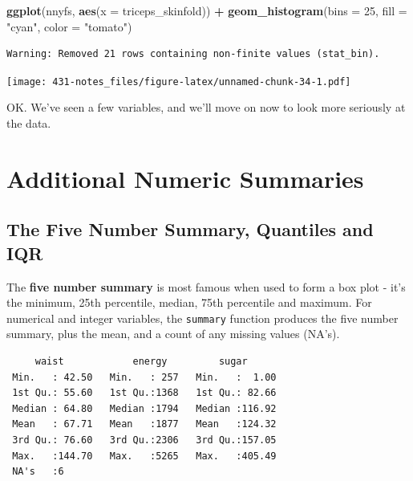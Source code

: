 \documentclass[
]{book}
\newenvironment{Shaded}{\begin{snugshade}}{\end{snugshade}}
\newcommand{\DataTypeTok}[1]{\textcolor[rgb]{0.13,0.29,0.53}{#1}}
\newcommand{\DecValTok}[1]{\textcolor[rgb]{0.00,0.00,0.81}{#1}}
\newcommand{\KeywordTok}[1]{\textcolor[rgb]{0.13,0.29,0.53}{\textbf{#1}}}
\newcommand{\NormalTok}[1]{#1}
\newcommand{\OperatorTok}[1]{\textcolor[rgb]{0.81,0.36,0.00}{\textbf{#1}}}
\newcommand{\StringTok}[1]{\textcolor[rgb]{0.31,0.60,0.02}{#1}}
\begin{document}
\begin{Shaded}
\begin{Highlighting}[]
\KeywordTok{ggplot}\NormalTok{(nnyfs, }\KeywordTok{aes}\NormalTok{(}\DataTypeTok{x =}\NormalTok{ triceps_skinfold)) }\OperatorTok{+}
\StringTok{  }\KeywordTok{geom_histogram}\NormalTok{(}\DataTypeTok{bins =} \DecValTok{25}\NormalTok{, }\DataTypeTok{fill =} \StringTok{"cyan"}\NormalTok{, }\DataTypeTok{color =} \StringTok{"tomato"}\NormalTok{)}
\end{Highlighting}
\end{Shaded}

\begin{verbatim}
Warning: Removed 21 rows containing non-finite values (stat_bin).
\end{verbatim}

\texttt{[image: 431-notes\_files/figure-latex/unnamed-chunk-34-1.pdf]}

OK. We've seen a few variables, and we'll move on now to look more seriously at the data.

\hypertarget{additional-numeric-summaries}{%
\section{Additional Numeric Summaries}\label{additional-numeric-summaries}}

\hypertarget{the-five-number-summary-quantiles-and-iqr}{%
\subsection{The Five Number Summary, Quantiles and IQR}\label{the-five-number-summary-quantiles-and-iqr}}

The \textbf{five number summary} is most famous when used to form a box plot - it's the minimum, 25th percentile, median, 75th percentile and maximum. For numerical and integer variables, the \texttt{summary} function produces the five number summary, plus the mean, and a count of any missing values (NA's).

\begin{Shaded}
\end{Shaded}

\begin{verbatim}
     waist            energy         sugar       
 Min.   : 42.50   Min.   : 257   Min.   :  1.00  
 1st Qu.: 55.60   1st Qu.:1368   1st Qu.: 82.66  
 Median : 64.80   Median :1794   Median :116.92  
 Mean   : 67.71   Mean   :1877   Mean   :124.32  
 3rd Qu.: 76.60   3rd Qu.:2306   3rd Qu.:157.05  
 Max.   :144.70   Max.   :5265   Max.   :405.49  
 NA's   :6                                       
\end{verbatim}
\end{document}
